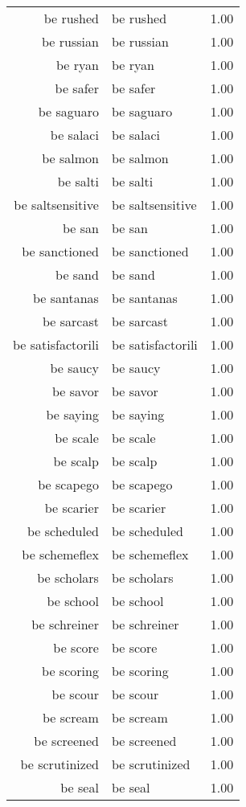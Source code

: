 \begin{table}[ht]
\begin{tabular}{rlr}
  be rushed & be rushed & 1.00 \\ 
  be russian & be russian & 1.00 \\ 
  be ryan & be ryan & 1.00 \\ 
  be safer & be safer & 1.00 \\ 
  be saguaro & be saguaro & 1.00 \\ 
  be salaci & be salaci & 1.00 \\ 
  be salmon & be salmon & 1.00 \\ 
  be salti & be salti & 1.00 \\ 
  be saltsensitive & be saltsensitive & 1.00 \\ 
  be san & be san & 1.00 \\ 
  be sanctioned & be sanctioned & 1.00 \\ 
  be sand & be sand & 1.00 \\ 
  be santanas & be santanas & 1.00 \\ 
  be sarcast & be sarcast & 1.00 \\ 
  be satisfactorili & be satisfactorili & 1.00 \\ 
  be saucy & be saucy & 1.00 \\ 
  be savor & be savor & 1.00 \\ 
  be saying & be saying & 1.00 \\ 
  be scale & be scale & 1.00 \\ 
  be scalp & be scalp & 1.00 \\ 
  be scapego & be scapego & 1.00 \\ 
  be scarier & be scarier & 1.00 \\ 
  be scheduled & be scheduled & 1.00 \\ 
  be schemeflex & be schemeflex & 1.00 \\ 
  be scholars & be scholars & 1.00 \\ 
  be school & be school & 1.00 \\ 
  be schreiner & be schreiner & 1.00 \\ 
  be score & be score & 1.00 \\ 
  be scoring & be scoring & 1.00 \\ 
  be scour & be scour & 1.00 \\ 
  be scream & be scream & 1.00 \\ 
  be screened & be screened & 1.00 \\ 
  be scrutinized & be scrutinized & 1.00 \\ 
  be seal & be seal & 1.00 \\ 

\end{tabular}
\end{table}
